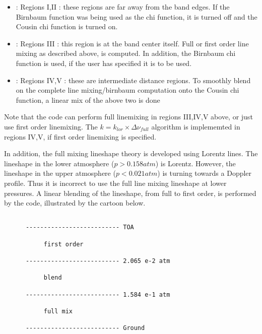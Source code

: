 \documentclass[11pt]{article}
\begin{document}
\begin{itemize}
\item : Regions I,II  : these regions are far away from the band edges. If the
                        Birnbaum function was being used as the chi function, 
                        it is turned off and the Cousin chi function is turned 
                        on. 
\item : Regions III   : this region is at the band center itself. Full or 
                        first order line mixing as described above, is 
                        computed. In addition, the Birnbaum chi function is 
                        used, if the user has specified it is to be used.\\
\item : Regions IV,V  : these are intermediate distance regions. To smoothly
                        blend on the complete line mixing/birnbaum computation
                        onto the Cousin chi function, a linear  mix of the 
                        above two is done\\
\end{itemize}

Note that the code can perform full linemixing in regions III,IV,V above, 
or just use first order linemixing. The $k=k_{lor} \times \Delta \nu_{full}$ 
algorithm is implememted in regions IV,V, if first order linemixing is 
specified. 

In addition, the full mixing lineshape theory is developed using Lorentz lines.
The lineshape in the lower atmosphere ($p > 0.158 atm$) is Lorentz. However,
the lineshape in the upper atmosphere ($p < 0.021 atm$) is turning towards a 
Doppler profile. Thus it is incorrect to use the full line mixing lineshape 
at lower pressures. A linear blending of the lineshape, from full to first
order, is performed by the code, illustrated by the cartoon below. 

\begin{verbatim}

      -------------------------- TOA

           first order

      -------------------------- 2.065 e-2 atm

           blend

      -------------------------- 1.584 e-1 atm

           full mix

      -------------------------- Ground
                      
\end{verbatim}
\end{document}
